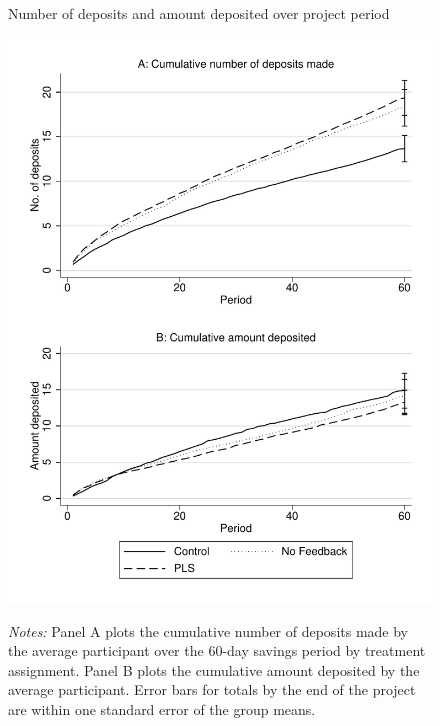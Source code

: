 \documentclass[12pt]{article}
\begin{document}
		\begin{figure}[ht]
			\caption{Number of deposits and amount deposited over project period}
			\includegraphics[height=0.85\textheight]{../../figures/line-cumdeposits.pdf}
			\label{fig:line-cumdeposits}
			\caption*{\footnotesize \emph{Notes:} Panel A plots the cumulative number of deposits made by the average participant over the 60-day savings period by treatment assignment. Panel B plots the cumulative amount deposited by the average participant. Error bars for totals by the end of the project are within one standard error of the group means.}
		\end{figure}

		\clearpage

\end{document}
